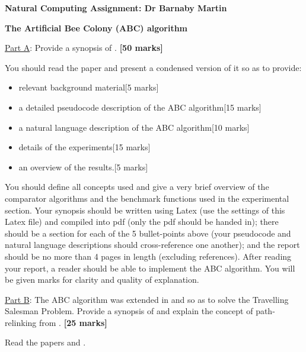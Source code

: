 \documentclass{article}
\begin{document}
\begin{center}
\large
{\bf Natural Computing Assignment: Dr Barnaby Martin}\bigskip

{\bf The Artificial Bee Colony (ABC) algorithm}
\normalsize
\end{center}

\noindent\underline{Part A}: Provide a synopsis of \cite{KB07}. \hfill{\bf [50 marks]}\smallskip

\noindent You should read the paper and present a condensed version of it so as to provide:

\begin{itemize}

\item relevant background material\hfill[5 marks]

\item a detailed pseudocode description of the ABC algorithm\hfill[15 marks]

\item a natural language description of the ABC algorithm\hfill[10 marks]

\item details of the experiments\hfill[15 marks]

\item an overview of the results.\hfill[5 marks]

\end{itemize}
You should define all concepts used and give a very brief overview of the comparator algorithms and the benchmark functions used in the experimental section. Your synopsis should be written using Latex (use the settings of this Latex file) and compiled into pdf (only the pdf should be handed in); there should be a section for each of the 5 bullet-points above (your pseudocode and natural language descriptions should cross-reference one another); and the report should be no more than 4 pages in length (excluding references). After reading your report, a reader should be able to implement the ABC algorithm. You will be given marks for clarity and quality of explanation.\bigskip

\noindent\underline{Part B}: The ABC algorithm was extended in \cite{KG11} and \cite{XBY11} so as to solve the Travelling Salesman Problem. Provide a synopsis of \cite{KG11} and explain the concept of path-relinking from \cite{XBY11}. \hfill{\bf [25 marks]}\smallskip

\noindent Read the papers \cite{KG11} and \cite{XBY11}.
\end{document}
